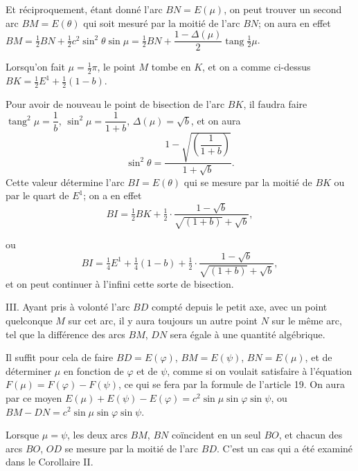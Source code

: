 \documentclass{article}
\begin{document}
Et réciproquement, étant donné l'arc $BN=E(\mu)$, on peut trouver un second arc $BM=E(\theta)$ qui soit mesuré par la moitié de l'arc $BN$; on aura en effet $BM=\frac{1}{2}BN+\frac{1}{2}c^{2}\sin^{2}\theta\sin\mu=\frac{1}{2}BN+\dfrac{1-\Delta(\mu)}{2}\operatorname{tang}\frac{1}{2}\mu$.

Lorsqu'on fait $\mu=\frac{1}{2}\pi$, le point $M$ tombe en $K$, et on a comme ci-dessus $BK=\frac{1}{2}E^{1}+\frac{1}{2}(1-b)$.

Pour avoir de nouveau le point de bisection de l'arc $BK$, il faudra faire $\operatorname{tang}^{2}\mu=\dfrac{1}{b}$, $\sin^{2}\mu=\dfrac{1}{1+b}$, $\Delta(\mu)=\sqrt{b}$, et on aura
\[ \sin^{2}\theta=\frac{1-\sqrt{\left(\dfrac{1}{1+b}\right)}}{1+\sqrt{b}}. \]
Cette valeur détermine l'arc $BI=E(\theta)$ qui se mesure par la moitié de $BK$ ou par le quart de $E^{1}$; on a en effet
\[ BI=\tfrac{1}{2}BK+\tfrac{1}{2}\cdot\frac{1-\sqrt{b}}{\sqrt{(1+b)}+\sqrt{b}}, \]

ou
\[ BI=\tfrac{1}{4}E^{1}+\tfrac{1}{4}(1-b)+\tfrac{1}{2}\cdot\frac{1-\sqrt{b}}{\sqrt{(1+b)}+\sqrt{b}}, \]
et on peut continuer à l'infini cette sorte de bisection.


III. Ayant pris à volonté l'arc $BD$ compté depuis le petit axe, avec un point quelconque $M$ sur cet arc, il y aura toujours un autre point $N$ sur le même arc, tel que la différence des arcs $BM$, $DN$ sera égale à une quantité algébrique.

Il suffit pour cela de faire $BD=E(\varphi)$, $BM=E(\psi)$, $BN=E(\mu)$, et de déterminer $\mu$ en fonction de $\varphi$ et de $\psi$, comme si on voulait satisfaire à l'équation $F(\mu)=F(\varphi)-F(\psi)$, ce qui se fera par la formule de l'article 19. On aura par ce moyen $E(\mu)+E(\psi)-E(\varphi)=c^{2}\sin\mu\sin\varphi\sin\psi$, ou $BM-DN=c^{2}\sin\mu\sin\varphi\sin\psi$.

Lorsque $\mu=\psi$, les deux arcs $BM$, $BN$ coïncident en un seul $BO$, et chacun des arcs $BO$, $OD$ se mesure par la moitié de l'arc $BD$. C'est un cas qui a été examiné dans le Corollaire II.

\end{document}
